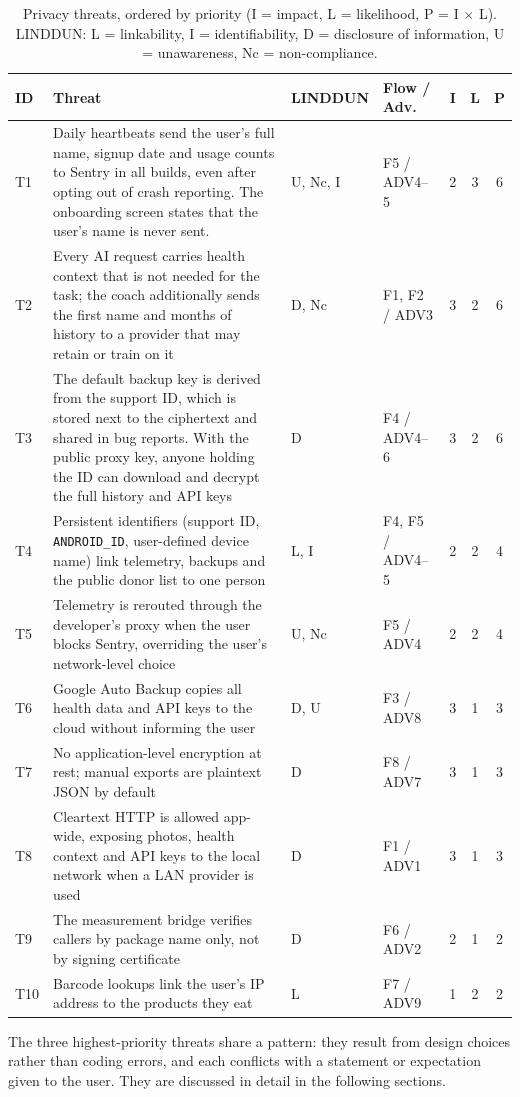\begin{table}[htbp]
\centering
\footnotesize
\caption{Privacy threats, ordered by priority (I = impact, L = likelihood, P = I $\times$ L).
LINDDUN: L = linkability, I = identifiability, D = disclosure of information,
U = unawareness, Nc = non-compliance.}
\label{tab:threats}
\begin{tabularx}{\textwidth}{@{}l L l l c c c@{}}
\toprule
\textbf{ID} & \textbf{Threat} & \textbf{LINDDUN} & \textbf{Flow / Adv.} & \textbf{I} & \textbf{L} & \textbf{P} \\
\midrule
T1 & Daily heartbeats send the user's full name, signup date and usage counts to Sentry in all
     builds, even after opting out of crash reporting. The onboarding screen states that the
     user's name is never sent.
   & U, Nc, I & F5 / ADV4--5 & 2 & 3 & 6 \\
T2 & Every AI request carries health context that is not needed for the task; the coach
     additionally sends the first name and months of history to a provider that may retain or
     train on it
   & D, Nc & F1, F2 / ADV3 & 3 & 2 & 6 \\
T3 & The default backup key is derived from the support ID, which is stored next to the
     ciphertext and shared in bug reports. With the public proxy key, anyone holding the ID can
     download and decrypt the full history and API keys
   & D & F4 / ADV4--6 & 3 & 2 & 6 \\
T4 & Persistent identifiers (support ID, \texttt{ANDROID\_ID}, user-defined device name) link
     telemetry, backups and the public donor list to one person
   & L, I & F4, F5 / ADV4--5 & 2 & 2 & 4 \\
T5 & Telemetry is rerouted through the developer's proxy when the user blocks Sentry, overriding
     the user's network-level choice
   & U, Nc & F5 / ADV4 & 2 & 2 & 4 \\
T6 & Google Auto Backup copies all health data and API keys to the cloud without informing the
     user
   & D, U & F3 / ADV8 & 3 & 1 & 3 \\
T7 & No application-level encryption at rest; manual exports are plaintext JSON by default
   & D & F8 / ADV7 & 3 & 1 & 3 \\
T8 & Cleartext HTTP is allowed app-wide, exposing photos, health context and API keys to the
     local network when a LAN provider is used
   & D & F1 / ADV1 & 3 & 1 & 3 \\
T9 & The measurement bridge verifies callers by package name only, not by signing certificate
   & D & F6 / ADV2 & 2 & 1 & 2 \\
T10 & Barcode lookups link the user's IP address to the products they eat
   & L & F7 / ADV9 & 1 & 2 & 2 \\
\bottomrule
\end{tabularx}
\end{table}

The three highest-priority threats share a pattern: they result from design choices rather than
coding errors, and each conflicts with a statement or expectation given to the user. They are
discussed in detail in the following sections.
